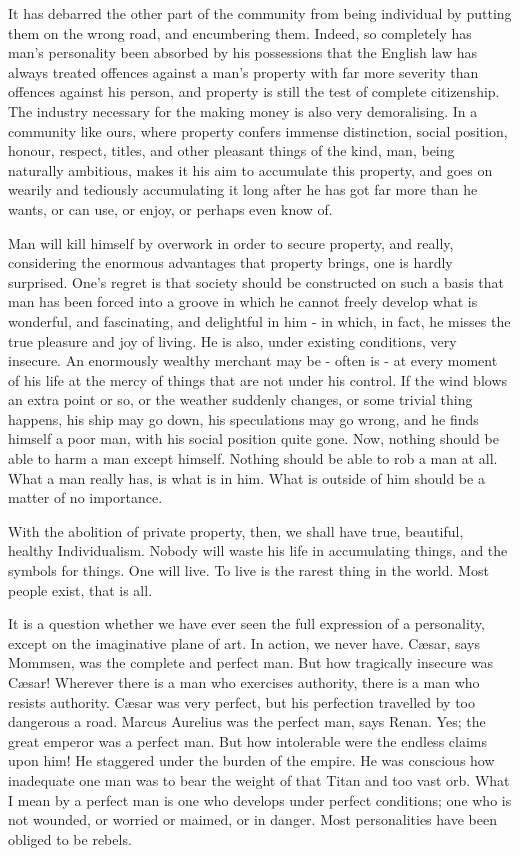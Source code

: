 It has debarred the other part of the community from being individual by putting them on the wrong road, and encumbering them. Indeed, so completely has man’s personality been absorbed by his possessions that the English law has always treated offences against a man’s property with far more severity than offences against his person, and property is still the test of complete citizenship. The industry necessary for the making money is also very demoralising. In a community like ours, where property confers immense distinction, social position, honour, respect, titles, and other pleasant things of the kind, man, being naturally ambitious, makes it his aim to accumulate this property, and goes on wearily and tediously accumulating it long after he has got far more than he wants, or can use, or enjoy, or perhaps even know of.\par

Man will kill himself by overwork in order to secure property, and really, considering the enormous advantages that property brings, one is hardly surprised. One’s regret is that society should be constructed on such a basis that man has been forced into a groove in which he cannot freely develop what is wonderful, and fascinating, and delightful in him - in which, in fact, he misses the true pleasure and joy of living. He is also, under existing conditions, very insecure. An enormously wealthy merchant may be - often is - at every moment of his life at the mercy of things that are not under his control. If the wind blows an extra point or so, or the weather suddenly changes, or some trivial thing happens, his ship may go down, his speculations may go wrong, and he finds himself a poor man, with his social position quite gone. Now, nothing should be able to harm a man except himself. Nothing should be able to rob a man at all. What a man really has, is what is in him. What is outside of him should be a matter of no importance.\par

With the abolition of private property, then, we shall have true, beautiful, healthy Individualism. Nobody will waste his life in accumulating things, and the symbols for things. One will live. To live is the rarest thing in the world. Most people exist, that is all.\par

It is a question whether we have ever seen the full expression of a personality, except on the imaginative plane of art. In action, we never have. Cæsar, says Mommsen, was the complete and perfect man. But how tragically insecure was Cæsar! Wherever there is a man who exercises authority, there is a man who resists authority. Cæsar was very perfect, but his perfection travelled by too dangerous a road. Marcus Aurelius was the perfect man, says Renan. Yes; the great emperor was a perfect man. But how intolerable were the endless claims upon him! He staggered under the burden of the empire. He was conscious how inadequate one man was to bear the weight of that Titan and too vast orb. What I mean by a perfect man is one who develops under perfect conditions; one who is not wounded, or worried or maimed, or in danger. Most personalities have been obliged to be rebels.\par

